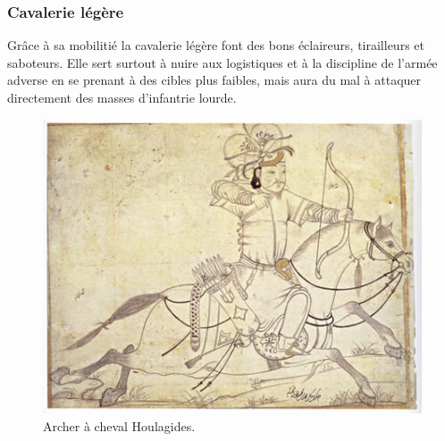 \documentclass{article}
\begin{document}
\subsubsection{Cavalerie légère}
Grâce à sa mobilitié la cavalerie légère font des bons éclaireurs, tirailleurs et saboteurs. Elle sert surtout à nuire aux logistiques et à la discipline de l'armée adverse en se prenant à des cibles plus faibles, mais aura du mal à attaquer directement des masses d'infantrie lourde.
\begin{center}
\begin{figure}[H]
\hfill
\begin{minipage}[H]{0.45\linewidth}
	\centering
	\includegraphics[width=\linewidth]{../ressources/IlkhanidHorseArcher}
	\caption{Archer à cheval Houlagides. \cite{archery}}
\end{minipage}
\hfill
\begin{minipage}[H]{0.4\linewidth}
	\centering

\end{minipage}
\end{figure}
\end{center}
\end{document}
